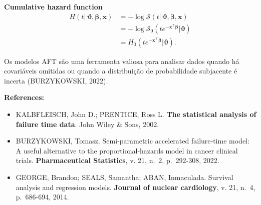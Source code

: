 \documentclass[
]{article}
\providecommand{\tightlist}{%
  \setlength{\itemsep}{0pt}\setlength{\parskip}{0pt}}
\begin{document}
\textbf{Cumulative hazard function} \[
\begin{align*} 
H(t| \ \pmb{\vartheta}, \pmb{\beta}, \mathbf{x}) & = -\log\mathcal{S}(t| \ \pmb{\vartheta}, \pmb{\beta}, \mathbf{x}) \\
& = -\log\mathcal{S}_0\left(te^{-\mathbf{x}^{\top}\pmb{\beta}}\Big|\pmb{\vartheta} \right) \\
& = H_0\left(te^{-\mathbf{x}^{\top}\pmb{\beta}}\Big|\pmb{\vartheta} \right).
\end{align*}
\]

Os modelos AFT são uma ferramenta valiosa para analisar dados quando há
covariáveis omitidas ou quando a distribuição de probabilidade
subjacente é incerta (BURZYKOWSKI, 2022).

\textbf{References:}

\begin{itemize}
\tightlist
\item
  KALBFLEISCH, John D.; PRENTICE, Ross L. \textbf{The statistical
  analysis of failure time data}. John Wiley \& Sons, 2002.
\item
  BURZYKOWSKI, Tomasz. Semi‐parametric accelerated failure‐time model: A
  useful alternative to the proportional‐hazards model in cancer
  clinical trials. \textbf{Pharmaceutical Statistics}, v. 21, n.~2,
  p.~292-308, 2022.
\item
  GEORGE, Brandon; SEALS, Samantha; ABAN, Inmaculada. Survival analysis
  and regression models. \textbf{Journal of nuclear cardiology}, v. 21,
  n.~4, p.~686-694, 2014.
\end{itemize}
\end{document}
